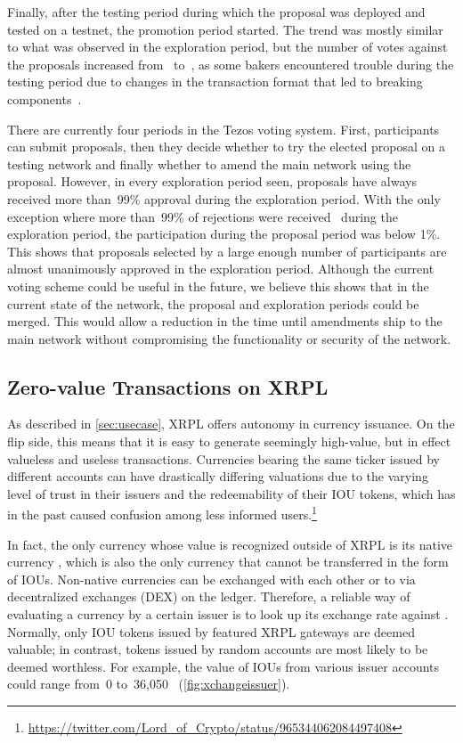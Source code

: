 Finally, after the testing period during which the proposal was deployed and tested on a testnet, the promotion period started.
The trend was mostly similar to what was observed in the exploration period, but the number of votes against the proposals increased from~ to~, as some bakers encountered trouble during the testing period due to changes in the transaction format that led to breaking components~\cite{ObsidianSys}.

There are currently four periods in the Tezos voting system.
First, participants can submit proposals, then they decide whether to try the elected proposal on a testing network and finally whether to amend the main network using the proposal.
However, in every exploration period seen, proposals have always received more than~99\% approval during the exploration period.
With the only exception where more than~99\% of rejections were received~\cite{tezos-vote-reject} during the exploration period, the participation during the proposal period was below 1\%.
This shows that proposals selected by a large enough number of participants are almost unanimously approved in the exploration period.
Although the current voting scheme could be useful in the future, we believe this shows that in the current state of the network, the proposal and exploration periods could be merged.
This would allow a reduction in the time until amendments ship to the main network without compromising the functionality or security of the network.

\subsection{Zero-value Transactions on XRPL}
\label{sec:xrpcase}

As described in \autoref{sec:usecase}, XRPL offers autonomy in currency issuance. On the flip side, this means that it is easy to generate seemingly high-value, but in effect valueless and useless transactions.
Currencies bearing the same ticker issued by different accounts can have drastically differing valuations due to the varying level of trust in their issuers and the redeemability of their IOU tokens, which has in the past caused confusion among less informed users.\footnote{\url{https://twitter.com/Lord_of_Crypto/status/965344062084497408}}

In fact, the only currency whose value is recognized outside of XRPL is its native currency , which is also the only currency that cannot be transferred in the form of IOUs.
Non-native currencies can be exchanged with each other or to  via decentralized exchanges (DEX) on the ledger.
Therefore, a reliable way of evaluating a currency by a certain issuer is to look up its exchange rate against .
Normally, only IOU tokens issued by featured XRPL gateways are deemed valuable; in contrast, tokens issued by random accounts are most likely to be deemed worthless.
For example, the value of  IOUs from various issuer accounts could range from~0 to~36,050~ (\autoref{fig:xchangeissuer}).


